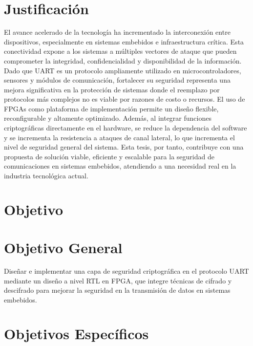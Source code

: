 \section{Justificación} 
El avance acelerado de la tecnología ha incrementado la interconexión entre dispositivos, especialmente en sistemas embebidos e infraestructura crítica. Esta conectividad expone a los sistemas a múltiples vectores de ataque que pueden comprometer la integridad, confidencialidad y disponibilidad de la información. Dado que UART es un protocolo ampliamente utilizado en microcontroladores, sensores y módulos de comunicación, fortalecer su seguridad representa una mejora significativa en la protección de sistemas donde el reemplazo por protocolos más complejos no es viable por razones de costo o recursos.
El uso de FPGAs como plataforma de implementación permite un diseño flexible, reconfigurable y altamente optimizado. Además, al integrar funciones criptográficas directamente en el hardware, se reduce la dependencia del software y se incrementa la resistencia a ataques de canal lateral, lo que incrementa el nivel de seguridad general del sistema.
Esta tesis, por tanto, contribuye con una propuesta de solución viable, eficiente y escalable para la seguridad de comunicaciones en sistemas embebidos, atendiendo a una necesidad real en la industria tecnológica actual.
\newpage
\section{Objetivo}
\section{Objetivo General}
Diseñar e implementar una capa de seguridad criptográfica en el protocolo UART mediante un diseño a nivel RTL en FPGA, que integre técnicas de cifrado y descifrado para mejorar la seguridad en la transmisión de datos en sistemas embebidos.
\\
\section{Objetivos Específicos}

